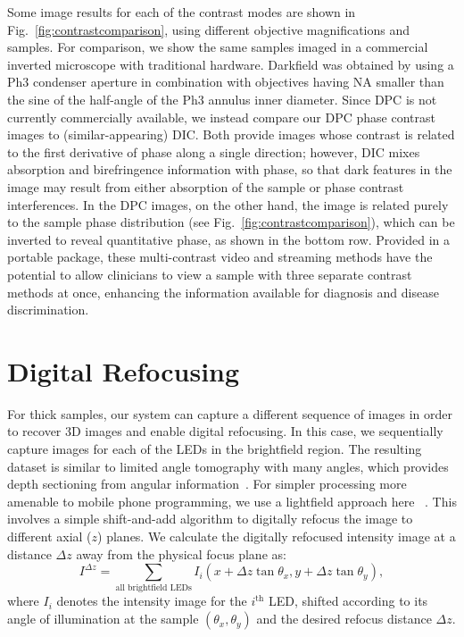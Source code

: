 Some image results for each of the contrast modes are shown in Fig.~\ref{fig:contrastcomparison}, using different objective magnifications and samples. For comparison, we show the same samples imaged in a commercial inverted microscope with traditional hardware. Darkfield was obtained by using a Ph3 condenser aperture in combination with objectives having NA smaller than the sine of the half-angle of the Ph3 annulus inner diameter. Since DPC is not currently commercially available, we instead compare our DPC phase contrast images to (similar-appearing) DIC. Both provide images whose contrast is related to the first derivative of phase along a single direction; however, DIC mixes absorption and birefringence information with phase, so that dark features in the image may result from either absorption of the sample or phase contrast interferences. In the DPC images, on the other hand, the image is related purely to the sample phase distribution (see Fig.~\ref{fig:contrastcomparison}), which can be inverted to reveal quantitative phase, as shown in the bottom row. Provided in a portable package, these multi-contrast video and streaming methods have the potential to allow clinicians to view a sample with three separate contrast methods at once, enhancing the information available for diagnosis and disease discrimination.

\section{Digital Refocusing}
For thick samples, our system can capture a different sequence of images in order to recover 3D images and enable digital refocusing. In this case, we sequentially capture images for each of the LEDs in the brightfield region. The resulting dataset is similar to limited angle tomography with many angles, which provides depth sectioning from angular information~\cite{Kak:1988fk}. For simpler processing more amenable to mobile phone programming, we use a lightfield approach here ~\cite{Ng2005,Zheng2011}. This involves a simple shift-and-add algorithm to digitally refocus the image to different axial ($z$) planes. We calculate the digitally refocused intensity image at a distance $\Delta z$ away from the physical focus plane as:
\begin{equation}
I^{\Delta z} = \sum_{\text{all brightfield LEDs}}I_i(x+\Delta z\tan{\theta_x}, y+\Delta z\tan{\theta_y}),
\label{I_refocus}
\end{equation}
where $I_i$ denotes the intensity image for the $i^{\text{th}}$ LED, shifted according to its angle of illumination at the sample $(\theta_x,\theta_y)$ and the desired refocus distance $\Delta z$.

